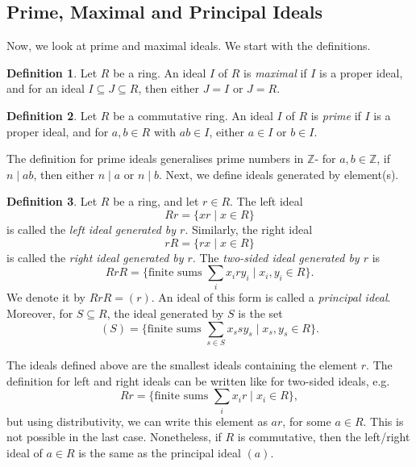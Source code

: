 \documentclass[a4paper, openany]{memoir}
\theoremstyle{definition}
\newtheorem{definition}{Definition}[section]
\theoremstyle{plain}
\begin{document}
\subsection{Prime, Maximal and Principal Ideals}
Now, we look at prime and maximal ideals. We start with the definitions.
\begin{definition}
Let $R$ be a ring. An ideal $I$ of $R$ is \emph{maximal} if $I$ is a proper ideal, and for an ideal $I \subseteq J \subseteq R$, then either $J = I$ or $J = R$.
\end{definition}
\begin{definition}
Let $R$ be a commutative ring. An ideal $I$ of $R$ is \emph{prime} if $I$ is a proper ideal, and for $a, b \in R$ with $ab \in I$, either $a \in I$ or $b \in I$.
\end{definition}
\noindent The definition for prime ideals generalises prime numbers in $\mathbb{Z}$- for $a, b \in \mathbb{Z}$, if $n \mid ab$, then either $n \mid a$ or $n \mid b$. Next, we define ideals generated by element(s).
\begin{definition}
Let $R$ be a ring, and let $r \in R$. The left ideal 
\[Rr = \{xr \mid x \in R\}\]
is called the \emph{left ideal generated by $r$}. Similarly, the right ideal
\[rR = \{rx \mid x \in R\}\]
is called the \emph{right ideal generated by $r$}. The \emph{two-sided ideal generated by $r$} is
\[RrR = \{\text{finite sums }\sum_{i} x_i r y_i \mid x_i, y_i \in R\}.\]
We denote it by $RrR = (r)$. An ideal of this form is called a \emph{principal ideal}. Moreover, for $S \subseteq R$, the ideal generated by $S$ is the set
\[(S) = \{\text{finite sums }\sum_{s \in S} x_s s y_s \mid x_s, y_s \in R\}.\]
\end{definition}
\noindent The ideals defined above are the smallest ideals containing the element $r$. The definition for left and right ideals can be written like for two-sided ideals, e.g.
\[Rr = \{\text{finite sums } \sum_{i} x_i r \mid x_i \in R\},\]
but using distributivity, we can write this element as $ar$, for some $a \in R$. This is not possible in the last case. Nonetheless, if $R$ is commutative, then the left/right ideal of $a \in R$ is the same as the principal ideal $(a)$.
\end{document}
